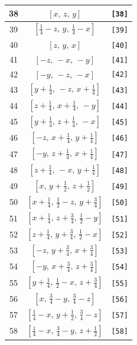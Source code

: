 \documentclass[fleqn,8pt]{jsarticle}
\begin{document}
\begin{longtable}{ccc}
38 & $\left[ x,\, z,\, y \right]$ & {\tt [38]} \\ \hline
39 & $\left[ \frac{1}{4} - z,\, y,\, \frac{1}{4} - x \right]$ & {\tt [39]} \\ \hline
40 & $\left[ z,\, y,\, x \right]$ & {\tt [40]} \\ \hline
41 & $\left[ - z,\, - x,\, - y \right]$ & {\tt [41]} \\ \hline
42 & $\left[ - y,\, - z,\, - x \right]$ & {\tt [42]} \\ \hline
43 & $\left[ y + \frac{1}{4},\, - z,\, x + \frac{1}{4} \right]$ & {\tt [43]} \\ \hline
44 & $\left[ z + \frac{1}{4},\, x + \frac{1}{4},\, - y \right]$ & {\tt [44]} \\ \hline
45 & $\left[ y + \frac{1}{4},\, z + \frac{1}{4},\, - x \right]$ & {\tt [45]} \\ \hline
46 & $\left[ - z,\, x + \frac{1}{4},\, y + \frac{1}{4} \right]$ & {\tt [46]} \\ \hline
47 & $\left[ - y,\, z + \frac{1}{4},\, x + \frac{1}{4} \right]$ & {\tt [47]} \\ \hline
48 & $\left[ z + \frac{1}{4},\, - x,\, y + \frac{1}{4} \right]$ & {\tt [48]} \\ \hline
49 & $\left[ x,\, y + \frac{1}{2},\, z + \frac{1}{2} \right]$ & {\tt [49]} \\ \hline
50 & $\left[ x + \frac{1}{4},\, \frac{1}{2} - z,\, y + \frac{3}{4} \right]$ & {\tt [50]} \\ \hline
51 & $\left[ x + \frac{1}{4},\, z + \frac{3}{4},\, \frac{1}{2} - y \right]$ & {\tt [51]} \\ \hline
52 & $\left[ z + \frac{1}{4},\, y + \frac{3}{4},\, \frac{1}{2} - x \right]$ & {\tt [52]} \\ \hline
53 & $\left[ - z,\, y + \frac{3}{4},\, x + \frac{3}{4} \right]$ & {\tt [53]} \\ \hline
54 & $\left[ - y,\, x + \frac{3}{4},\, z + \frac{3}{4} \right]$ & {\tt [54]} \\ \hline
55 & $\left[ y + \frac{1}{4},\, \frac{1}{2} - x,\, z + \frac{3}{4} \right]$ & {\tt [55]} \\ \hline
56 & $\left[ x,\, \frac{3}{4} - y,\, \frac{3}{4} - z \right]$ & {\tt [56]} \\ \hline
57 & $\left[ \frac{1}{4} - x,\, y + \frac{1}{2},\, \frac{3}{4} - z \right]$ & {\tt [57]} \\ \hline
58 & $\left[ \frac{1}{4} - x,\, \frac{3}{4} - y,\, z + \frac{1}{2} \right]$ & {\tt [58]} \\ \hline

\end{longtable}
\end{document}
